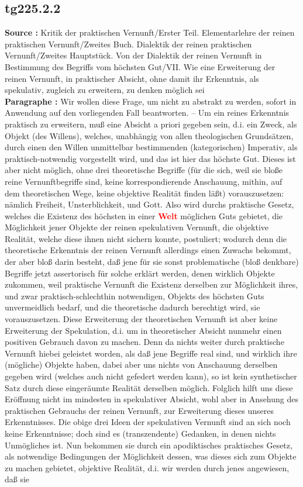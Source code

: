 \documentclass[a4paper,12pt,twoside]{book}
\newcommand{\match}[1]{\textcolor{red}{\textbf{#1}}}
\begin{document}
	\subsection*{tg225.2.2} 
	\textbf{Source : }Kritik der praktischen Vernunft/Erster Teil. Elementarlehre der reinen praktischen Vernunft/Zweites Buch. Dialektik der reinen praktischen Vernunft/Zweites Hauptstück. Von der Dialektik der reinen Vernunft in Bestimmung des Begriffs vom höchsten Gut/VII. Wie eine Erweiterung der reinen Vernunft, in praktischer Absicht, ohne damit ihr Erkenntnis, als spekulativ, zugleich zu erweitern, zu denken möglich sei\\  
	
	\noindent\textbf{Paragraphe : }Wir wollen diese Frage, um nicht zu abstrakt zu werden, sofort in Anwendung auf den vorliegenden Fall beantworten. – Um ein reines Erkenntnis praktisch zu erweitern, muß eine Absicht a priori gegeben sein, d.i. ein Zweck, als Objekt (des Willens), welches, unabhängig von allen theologischen Grundsätzen, durch einen den Willen unmittelbar bestimmenden (kategorischen) Imperativ, als praktisch-notwendig vorgestellt wird, und das ist hier das höchste Gut. Dieses ist aber nicht möglich, ohne drei theoretische Begriffe (für die sich, weil sie bloße reine Vernunftbegriffe sind, keine korrespondierende Anschauung, mithin, auf dem theoretischen Wege, keine objektive Realität finden läßt) vorauszusetzen: nämlich Freiheit, Unsterblichkeit, und Gott. Also wird durchs praktische Gesetz, welches die Existenz des höchsten in einer \match{Welt} möglichen Guts gebietet,  die Möglichkeit jener Objekte der reinen spekulativen Vernunft, die objektive Realität, welche diese ihnen nicht sichern konnte, postuliert; wodurch denn die theoretische Erkenntnis der reinen Vernunft allerdings einen Zuwachs bekommt, der aber bloß darin besteht, daß jene für sie sonst problematische (bloß denkbare) Begriffe jetzt assertorisch für solche erklärt werden, denen wirklich Objekte zukommen, weil praktische Vernunft die Existenz derselben zur Möglichkeit ihres, und zwar praktisch-schlechthin notwendigen, Objekts des höchsten Guts unvermeidlich bedarf, und die theoretische dadurch berechtigt wird, sie vorauszusetzen. Diese Erweiterung der theoretischen Vernunft ist aber keine Erweiterung der Spekulation, d.i. um in theoretischer Absicht nunmehr einen positiven Gebrauch davon zu machen. Denn da nichts weiter durch praktische Vernunft hiebei geleistet worden, als daß jene Begriffe real sind, und wirklich ihre (mögliche) Objekte haben, dabei aber uns nichts von Anschauung derselben gegeben wird (welches auch nicht gefedert werden kann), so ist kein synthetischer Satz durch diese eingeräumte Realität derselben möglich. Folglich hilft uns diese Eröffnung nicht im mindesten in spekulativer Absicht, wohl aber in Ansehung des praktischen Gebrauchs der reinen Vernunft, zur Erweiterung dieses unseres Erkenntnisses. Die obige drei Ideen der spekulativen Vernunft sind an sich noch keine Erkenntnisse; doch sind es (transzendente) Gedanken, in denen nichts Unmögliches ist. Nun bekommen sie durch ein apodiktisches praktisches Gesetz, als notwendige Bedingungen der Möglichkeit dessen, was dieses sich zum Objekte zu machen gebietet, objektive Realität, d.i. wir werden durch jenes angewiesen, daß sie 
\end{document}

